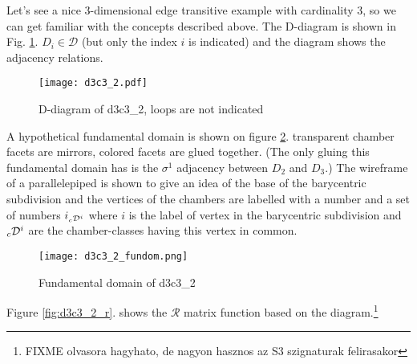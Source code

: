 \documentclass[12pt,a4paper]{article}
\newcommand{\leftsub}[2]{{\vphantom{#2}}_{#1}{#2}}
\theoremstyle{plain}%
\theoremstyle{definition}
\theoremstyle{remark}
\begin{document}
Let's see a nice $3$-dimensional edge transitive example with cardinality $3$,
so we can get familiar with the concepts described above. The D-diagram is shown
in Fig.  \ref{fig:d3c3_2}. $D_i\in \mathcal{D}$ (but only the index $i$ is
indicated) and the diagram shows the adjacency relations.

\begin{figure}
  \caption{\label{fig:d3c3_2} D-diagram of d3c3\_2, loops are not indicated}
  \center
  \texttt{[image: d3c3\_2.pdf]}
\end{figure}

A hypothetical fundamental domain is shown on figure \ref{fig:d3c3_2_fundom}.
transparent chamber facets are mirrors, colored facets are glued together. (The
only gluing this fundamental domain has is the $\sigma^1$ adjacency between
$D_2$ and $D_3$.) The wireframe of a parallelepiped is shown to give an idea of
the base of the barycentric subdivision and the vertices of the chambers are
labelled with a number and a set of numbers $i_{\leftsub{c}{\mathcal{D}}^i}$
where $i$ is the label of vertex in the barycentric subdivision and
$\leftsub{c}{\mathcal{D}}^i$ are the chamber-classes having this vertex in
common.

\begin{figure}
  \caption{\label{fig:d3c3_2_fundom} Fundamental domain of d3c3\_2}
  \center
  \texttt{[image: d3c3\_2\_fundom.png]}
\end{figure}

Figure \ref{fig:d3c3_2_r}. shows the $\mathcal{R}$ matrix function based on the
diagram.\footnote{FIXME olvasora hagyhato, de nagyon hasznos az S3 szignaturak
felirasakor}
\end{document}
